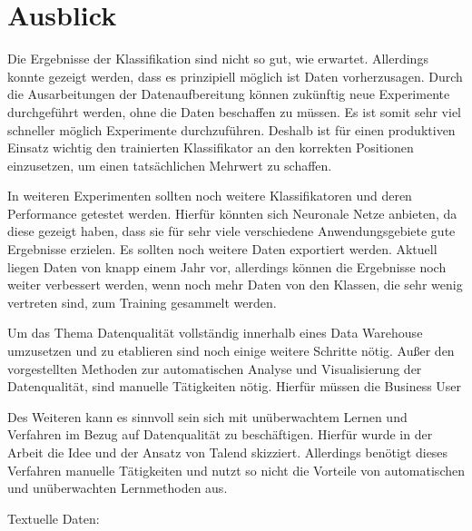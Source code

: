 \chapter{Ausblick}\label{ch:outlook}
Die Ergebnisse der Klassifikation sind nicht so gut, wie erwartet. 
Allerdings konnte gezeigt werden, dass es prinzipiell möglich ist Daten vorherzusagen.
Durch die Ausarbeitungen der Datenaufbereitung können zukünftig neue Experimente durchgeführt werden, ohne die Daten beschaffen zu müssen. 
Es ist somit sehr viel schneller möglich Experimente durchzuführen.
Deshalb ist für einen produktiven Einsatz wichtig den trainierten Klassifikator an den korrekten Positionen einzusetzen, um einen tatsächlichen Mehrwert zu schaffen.


In weiteren Experimenten sollten noch weitere Klassifikatoren und deren Performance getestet werden.
Hierfür könnten sich Neuronale Netze anbieten, da diese gezeigt haben, dass sie für sehr viele verschiedene Anwendungsgebiete gute Ergebnisse erzielen.
Es sollten noch weitere Daten exportiert werden. 
Aktuell liegen Daten von knapp einem Jahr vor, allerdings können die Ergebnisse noch weiter verbessert werden, wenn noch mehr Daten von den Klassen, die sehr wenig vertreten sind, zum Training gesammelt werden. 


Um das Thema Datenqualität vollständig innerhalb eines Data Warehouse umzusetzen und zu etablieren sind noch einige weitere Schritte nötig.
Außer den vorgestellten Methoden zur automatischen Analyse und Visualisierung der Datenqualität, sind manuelle Tätigkeiten nötig.
Hierfür müssen die Business User 


Des Weiteren kann es sinnvoll sein sich mit unüberwachtem Lernen und Verfahren im Bezug auf Datenqualität zu beschäftigen.
Hierfür wurde in der Arbeit die Idee und der Ansatz von Talend skizziert. 
Allerdings benötigt dieses Verfahren manuelle Tätigkeiten und nutzt so nicht die Vorteile von automatischen und unüberwachten Lernmethoden aus. 





Textuelle Daten: 


